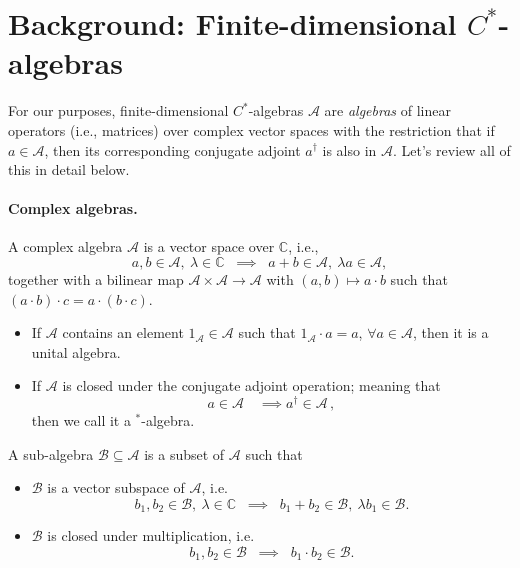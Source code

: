 \section{Background: Finite-dimensional $C^*$-algebras}

For our purposes, finite-dimensional $C^*$-algebras $\mathcal{A}$ are \emph{algebras} of linear operators (i.e., matrices) over complex vector spaces with the restriction that if $a \in \mathcal{A}$, then its corresponding conjugate adjoint $a^\dag$ is also in $\mathcal{A}$. Let's review all of this in detail below. 

\paragraph{Complex algebras.}

\begin{definition}
A complex algebra $\mathcal{A}$ is a vector space over $\mathbb{C}$, i.e.,
 \[
    a,b \in \mathcal{A}, \ \lambda \in \mathbb{C} \;\; \implies \;\; a+b \in \mathcal{A}, \ \lambda a \in \mathcal{A},
    \]
together with a bilinear map $\mathcal{A} \times \mathcal{A} \rightarrow \mathcal{A}$ with $(a,b) \mapsto a \cdot b$ such that $(a\cdot b)\cdot c = a \cdot (b \cdot c)$.
\begin{itemize}
    \item If $\mathcal{A}$ contains an element $1_{\mathcal{A}} \in \mathcal{A}$ such that $1_{\mathcal{A}} \cdot a = a$, $\forall a \in \mathcal{A}$, then it is a unital algebra.
\item If $\mathcal{A}$ is closed under the conjugate adjoint operation; meaning that
$$
a \in \mathcal{A} \quad \implies a^\dag \in \mathcal{A} \, ,
$$
then we call it a $^*$-algebra.
\end{itemize}
\end{definition}

\begin{definition}
A sub-algebra $\mathcal{B} \subseteq \mathcal{A}$ is a subset of $\mathcal{A}$ such that
\begin{itemize}
    \item \(\mathcal{B}\) is a vector subspace of \(\mathcal{A}\), i.e.
    \[
    b_1,b_2 \in \mathcal{B}, \ \lambda \in \mathbb{C} \;\; \implies \;\; b_1+b_2 \in \mathcal{B}, \ \lambda b_1 \in \mathcal{B}.
    \]

    \item \(\mathcal{B}\) is closed under multiplication, i.e.
    \[
    b_1,b_2  \in \mathcal{B} \;\; \implies \;\; b_1 \cdot b_2  \in \mathcal{B}.
    \]
\end{itemize}
    
\end{definition}

